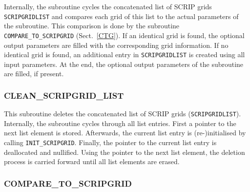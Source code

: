 \documentclass[11pt,twoside]{article}
\begin{document}
Internally, the subroutine cycles the concatenated list of SCRIP grids
 \verb|SCRIPGRIDLIST| and compares each grid of this list to the actual
parameters of the subroutine. This comparison is done  by 
 the subroutine \verb|COMPARE_TO_SCRIPGRID| (Sect.~\ref{CTG}). 
If an identical grid is found, the optional output parameters are
 filled with the corresponding grid information.
 If no identical grid is found, an
 additional entry in \verb|SCRIPGRIDLIST| is created using all input
 parameters. At the end, the optional output parameters of the
 subroutine are filled, if present.

\subsubsection{CLEAN\_SCRIPGRID\_LIST\label{CLEANSGL}}
This subroutine deletes the concatenated list of
SCRIP grids (\verb|SCRIPGRIDLIST|).
Internally, the subroutine cycles through all list entries. First a 
pointer to the next list element is stored. Afterwards, 
 the current list entry is (re-)initialised by
 calling \verb|INIT_SCRIPGRID|. Finally, the pointer to the current
 list entry is deallocated and nullified. 
Using the pointer to the next list element, the deletion process is
carried forward until all list elements are erased.

\subsubsection{COMPARE\_TO\_SCRIPGRID\label{CTG}}
\end{document}
